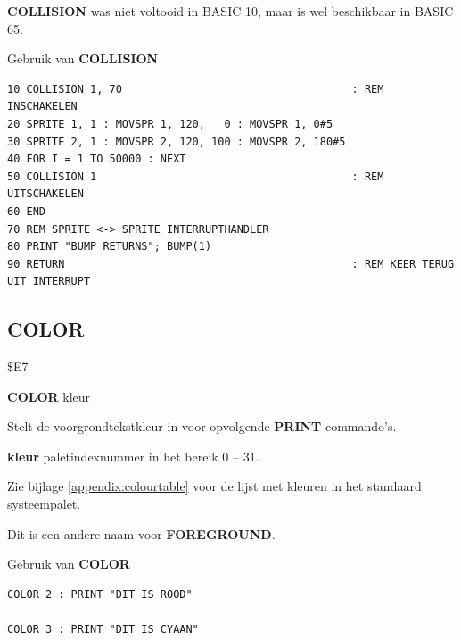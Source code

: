 \begin{description}[leftmargin=2cm,style=nextline]
                 {\bf COLLISION} was niet voltooid in BASIC 10, maar is wel beschikbaar in BASIC 65.

\item [Voorbeeld:] Gebruik van {\bf COLLISION}

\begin{tcolorbox}[colback=black,coltext=white]
\verbatimfont{\codefont}
\begin{verbatim}
10 COLLISION 1, 70                                    : REM INSCHAKELEN
20 SPRITE 1, 1 : MOVSPR 1, 120,   0 : MOVSPR 1, 0#5
30 SPRITE 2, 1 : MOVSPR 2, 120, 100 : MOVSPR 2, 180#5
40 FOR I = 1 TO 50000 : NEXT
50 COLLISION 1                                        : REM UITSCHAKELEN
60 END
70 REM SPRITE <-> SPRITE INTERRUPTHANDLER
80 PRINT "BUMP RETURNS"; BUMP(1)
90 RETURN                                             : REM KEER TERUG UIT INTERRUPT
\end{verbatim}
\end{tcolorbox}
\end{description}


\newpage
\subsection{COLOR}
\begin{description}[leftmargin=2cm,style=nextline]
\item [Token:]   \$E7

\item [Formaat:]  {\bf COLOR} kleur

\item [Gebruik:]   Stelt de voorgrondtekstkleur in voor opvolgende {\bf PRINT}-commando's.

                 {\bf kleur} paletindexnummer in het bereik 0 -- 31.

                 Zie bijlage \vref{appendix:colourtable} voor de lijst met kleuren in het standaard systeempalet.

\item [Opmerkingen:] Dit is een andere naam voor {\bf FOREGROUND}.

\item [Voorbeeld:] Gebruik van {\bf COLOR}

\begin{tcolorbox}[colback=black,coltext=white]
\verbatimfont{\codefont}
\begin{verbatim}
COLOR 2 : PRINT "DIT IS ROOD"

COLOR 3 : PRINT "DIT IS CYAAN"
\end{verbatim}
\end{tcolorbox}
\end{description}


